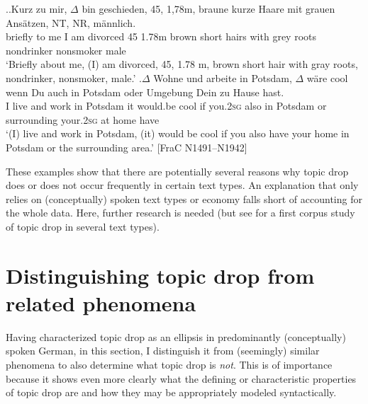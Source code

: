 \ex.\label{ex:frac.class.ad}\ag.Kurz zu mir, $\Delta$ bin geschieden, 45, 1,78m, braune kurze Haare mit grauen Ansätzen, NT, NR, männlich.\\
briefly to me I am divorced 45 1.78m brown short hairs with grey roots nondrinker nonsmoker male\\
`Briefly about me, (I) am divorced, 45, 1.78 m, brown short hair with gray roots, nondrinker, nonsmoker, male.'
\bg.$\Delta$ Wohne und arbeite in Potsdam, $\Delta$ wäre cool wenn Du auch in Potsdam oder Umgebung Dein zu Hause hast.\\
I live and work in Potsdam it would.be cool if you.\textsc{2sg} also in Potsdam or surrounding your.\textsc{2sg} at home have\\
`(I) live and work in Potsdam, (it) would be cool if you also have your home in Potsdam or the surrounding area.' [FraC N1491--N1942]

These examples show that there are potentially several reasons why topic drop does or does not occur frequently in certain text types.
An explanation that only relies on (conceptually) spoken text types or economy falls short of accounting for the whole data.
Here, further research is needed (but see \cite{ruppenhofer2018} for a first corpus study of topic drop in several text types).
 

\section{Distinguishing topic drop from related phenomena}\label{sec:delimitation}
Having characterized topic drop as an ellipsis in predominantly (conceptually) spoken German, in this section, I distinguish it from (seemingly) similar phenomena to also determine what topic drop is \textit{not}.
This is of importance because it shows even more clearly what the defining or characteristic properties of topic drop are and how they may be appropriately modeled syntactically.

